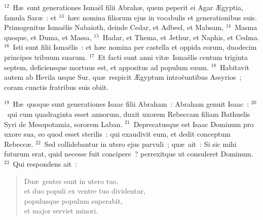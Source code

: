 ${}^{12}$~H\ae\ sunt generationes Isma\"el filii Abrah\ae , quem peperit ei Agar \AE gyptia, famula Sar\ae~: et
${}^{13}$~h\ae c nomina filiorum ejus in vocabulis et generationibus suis. Primogenitus Isma\"elis Nabaioth, deinde Cedar, et Adbeel, et Mabsam,
${}^{14}$~Masma quoque, et Duma, et Massa,
${}^{15}$~Hadar, et Thema, et Jethur, et Naphis, et Cedma.
${}^{16}$~Isti sunt filii Isma\"elis~: et h\ae c nomina per castella et oppida eorum, duodecim principes tribuum suarum.
${}^{17}$~Et facti sunt anni vit\ae\ Isma\"elis centum triginta septem, deficiensque mortuus est, et appositus ad populum suum.
${}^{18}$~Habitavit autem ab Hevila usque Sur, qu\ae\ respicit \AE gyptum intro\"euntibus Assyrios~; coram cunctis fratribus suis obiit.


${}^{19}$~H\ae\ quoque sunt generationes Isaac filii Abraham~: Abraham genuit Isaac~:
${}^{20}$~qui cum quadraginta esset annorum, duxit uxorem Rebeccam filiam Bathuelis Syri de Mesopotamia, sororem Laban.
${}^{21}$~Deprecatusque est Isaac Dominum pro uxore sua, eo quod esset sterilis~: qui exaudivit eum, et dedit conceptum Rebecc\ae .
${}^{22}$~Sed collidebantur in utero ejus parvuli~; qu\ae\ ait~: Si sic mihi futurum erat, quid necesse fuit concipere~? perrexitque ut consuleret Dominum.
${}^{23}$~Qui respondens ait~: \begin{flushleft}\begin{verse}Du\ae\ gentes sunt in utero tuo,\\ et duo populi ex ventre tuo dividentur,\\ populusque populum superabit,\\ et major serviet minori.\end{verse}\end{flushleft}


